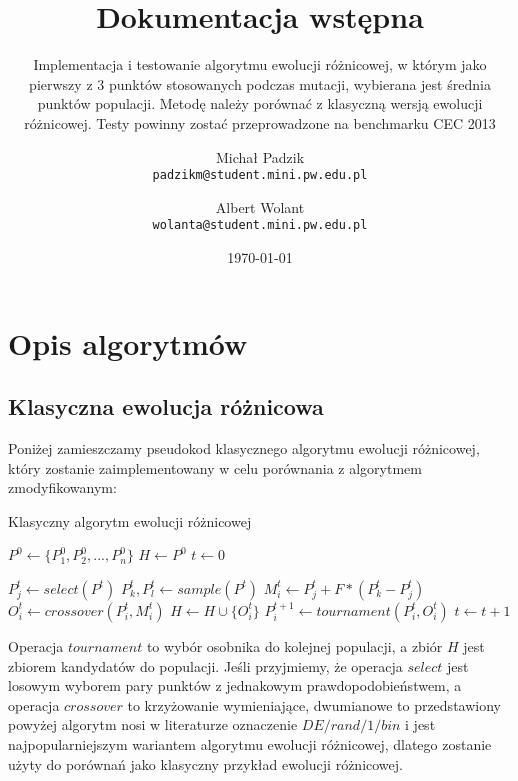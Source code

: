 \documentclass{scrartcl}
\title{Dokumentacja wstępna}
\subtitle{Implementacja i testowanie algorytmu ewolucji różnicowej, w którym jako pierwszy z 3 punktów stosowanych podczas mutacji, wybierana jest średnia punktów populacji. Metodę należy porównać z klasyczną wersją ewolucji różnicowej. Testy powinny zostać przeprowadzone na benchmarku CEC 2013}
\date{\today}
\author{
  Michał Padzik\\
  \texttt{padzikm@student.mini.pw.edu.pl}
  \and
  Albert Wolant\\
  \texttt{wolanta@student.mini.pw.edu.pl}
}
\begin{document}
\maketitle
{}
\newpage
{}

\section{Opis algorytmów}

\subsection{Klasyczna ewolucja różnicowa}

Poniżej zamieszczamy pseudokod klasycznego algorytmu ewolucji różnicowej, który zostanie zaimplementowany w celu porównania z algorytmem zmodyfikowanym:
\vspace{5mm}

\begin{algorithm}
\caption{Klasyczny algorytm ewolucji różnicowej}\label{euclid}
\begin{algorithmic}

\State $P^0 \gets \{ P^0_1, P^0_2, ... , P^0_n\}$
\State $H \gets P^0$
\State $t \gets 0$

\State $P^t_j \gets select(P^t)$
\vspace{1mm}
\State $P^t_k, P^t_l \gets sample(P^t)$
\vspace{1mm}
\State $M^t_i \gets P^t_j + F * (P^t_k - P^t_j)$
\vspace{1mm}
\State $O^t_i \gets crossover(P^t_i, M^t_i)$
\vspace{1mm}
\State $H \gets H \cup \{O^t_i\}$
\vspace{1mm}
\State $P^{t+1}_i \gets tournament(P^t_i, O^t_i)$
\vspace{1mm}
\EndFor
\State $t \gets t+1$
\EndWhile

\EndProcedure
\end{algorithmic}
\end{algorithm}

Operacja $tournament$ to wybór osobnika do kolejnej populacji, a zbiór $H$ jest zbiorem kandydatów do populacji. Jeśli przyjmiemy, że operacja $select$ jest losowym wyborem pary punktów z jednakowym prawdopodobieństwem, a operacja $crossover$ to krzyżowanie wymieniające, dwumianowe to przedstawiony powyżej algorytm nosi w literaturze oznaczenie $DE/rand/1/bin$ i jest najpopularniejszym wariantem algorytmu ewolucji różnicowej, dlatego zostanie użyty do porównań jako klasyczny przykład ewolucji różnicowej.
\end{document}
